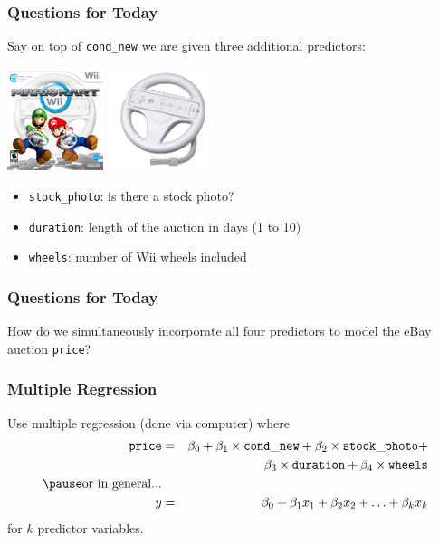 \documentclass[handout]{beamer}
\newcommand{\blue}[1]{\textcolor{blue2}{#1}}
\begin{document}
\begin{frame}[fragile]
\frametitle{Questions for Today}


Say on top of {\tt cond\_new} we are given three additional predictors:
\begin{center}
\includegraphics[height=3cm]{figure/mario_kart_action.png}
\includegraphics[height=3cm]{figure/wheel.png}
\end{center}
\pause

\begin{itemize}
\item {\tt stock\_photo}: is there a stock photo?
\item {\tt duration}: length of the auction in days (1 to 10)
\item {\tt wheels}: number of Wii wheels included
\end{itemize}


\end{frame}


\begin{frame}[fragile]
\frametitle{Questions for Today}

How do we simultaneously incorporate all four predictors to model the eBay auction {\tt price}?

\end{frame}


\begin{frame}[fragile]
\frametitle{Multiple Regression}
%
%
Use \blue{multiple regression} (done via computer) where
\begin{eqnarray*}
{\tt price} &=& \beta_0 + \beta_1 \times {\tt cond\_new} + \beta_2 \times {\tt stock\_photo} + \\ 
&&\beta_3 \times {\tt duration} + \beta_4 \times {\tt wheels}\\
\pause
\mbox{or in general...} &&\\
y &=& \beta_0 + \beta_1 x_1 + \beta_2 x_2 + \ldots + \beta_k x_k
\end{eqnarray*}
for $k$ predictor variables.

\end{frame}
\end{document}
